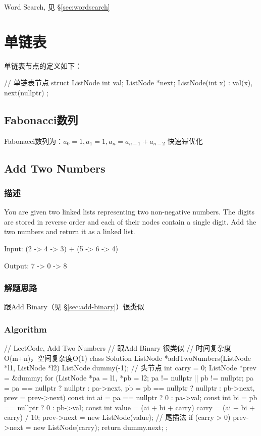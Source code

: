 \begindot
\item Word Search, 见 \S \ref{sec:wordsearch}
\myenddot


\section{单链表} %

单链表节点的定义如下：
\begin{Code}
	// 单链表节点
	struct ListNode {
		int val;
		ListNode *next;
		ListNode(int x) : val(x), next(nullptr) { }
	};
\end{Code}

\subsection{Fabonacci数列}
Fabonacci数列为：$a_0=1,a_1=1,a_n=a_{n-1}+a_{n-2}$
快速幂优化

\subsection{Add Two Numbers}
\label{sec:add-two-numbers}


\subsubsection{描述}
You are given two linked lists representing two non-negative numbers. The 
digits are stored in reverse order and each of their nodes contain a single 
digit. Add the two numbers and return it as a linked list.

Input: {\small {} (2 -> 4 -> 3) + (5 -> 6 -> 4)}

Output: {\small {} 7 -> 0 -> 8}


\subsubsection{解题思路}
跟Add Binary（见 \S \ref{sec:add-binary}）很类似


\subsubsection{Algorithm}
\begin{Code}
	// LeetCode, Add Two Numbers
	// 跟Add Binary 很类似
	// 时间复杂度O(m+n)，空间复杂度O(1)
	class Solution {
		ListNode *addTwoNumbers(ListNode *l1, ListNode *l2) {
			ListNode dummy(-1); // 头节点
			int carry = 0;
			ListNode *prev = &dummy;
			for (ListNode *pa = l1, *pb = l2;
				pa != nullptr || pb != nullptr;
				pa = pa == nullptr ? nullptr : pa->next,
				pb = pb == nullptr ? nullptr : pb->next,
				prev = prev->next) {
					const int ai = pa == nullptr ? 0 : pa->val;
					const int bi = pb == nullptr ? 0 : pb->val;
					const int value = (ai + bi + carry) %
					carry = (ai + bi + carry) / 10;
					prev->next = new ListNode(value); // 尾插法
			}
			if (carry > 0)
				prev->next = new ListNode(carry);
			return dummy.next;
		}
	};
\end{Code}


